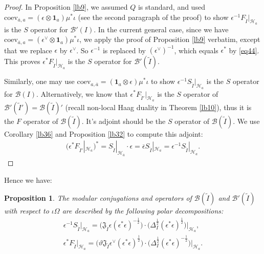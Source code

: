 \documentclass[12pt,a4paper]{article}
\theoremstyle{definition}
\theoremstyle{plain}
\newtheorem{pp}[df]{Proposition}
\newcommand{\fk}{\mathfrak}
\newcommand{\mc}{\mathcal}
\newcommand{\wtd}{\widetilde}
\newcommand{\ovl}{\overline}
\newcommand{\id}{\mathbf{1}}
\newcommand{\coev}{\mathrm{coev}}
\numberwithin{equation}{section}
\begin{document}
\begin{proof}
In Proposition \ref{lb9}, we assumed $Q$ is standard, and used $\coev_{\ovl a,a}=(\epsilon\otimes\id_a)\mu^*\iota$ (see the second paragraph of the proof) to show $\epsilon^{-1}F_{\wtd I}|_{\mc H_a}$ is the $S$ operator for $\mc B'(I)$. In the current general case, since we have $\coev_{\ovl a,a}=(\epsilon^\vee\otimes\id_a)\mu^*\iota$, we apply the proof of Proposition \ref{lb9} verbatim, except that we replace $\epsilon$ by $\epsilon^\vee$. So $\epsilon^{-1}$ is replaced by $(\epsilon^\vee)^{-1}$, which equals $\epsilon^*$ by \eqref{eq44}. This proves $\epsilon^* F_{\wtd I}|_{\mc H_a}$ is the $S$ operator for $\mc B'(\wtd I)$.

Similarly, one may use $\coev_{a,\ovl a}=(\id_a\otimes\epsilon)\mu^*\iota$ to show $\epsilon^{-1}S_{\wtd I}|_{\mc H_a}$ is the $S$ operator for $\mc B(I)$. Alternatively, we know that $\epsilon^*F_{\wtd I'}|_{\mc H_a}$ is the $S$ operator of $\mc B'(\wtd I')=\mc B(\wtd I)'$ (recall non-local Haag duality in Theorem \ref{lb10}), thus it is the $F$ operator of $\mc B(\wtd I)$. It's adjoint should be the $S$ operator of $\mc B(\wtd I)$. We use Corollary \ref{lb36} and Proposition \ref{lb32} to compute this adjoint:
\begin{align*}
(\epsilon^*F_{\wtd I'}|_{\mc H_a})^*=	S_{\wtd I}|_{\mc H_{\ovl a}}\cdot \epsilon=\ovl\epsilon S_{\wtd I}|_{\mc H_a}=\epsilon^{-1} S_{\wtd I}|_{\mc H_a}.
\end{align*}
\end{proof}

Hence we have:
\begin{pp}\label{lb15}
The modular conjugations and operators of $\mc B(\wtd I)$ and $\mc B'(\wtd I)$ with respect to $\iota\Omega$ are described by the following polar decompositions:
\begin{gather}
\epsilon^{-1} S_{\wtd I}\big|_{\mc H_a}=\big(\fk J_{\wtd I}\epsilon(\epsilon^*\epsilon)^{-\frac 12}\big)\cdot\big(\Delta_I^{\frac 12}(\epsilon^*\epsilon)^{\frac 12}\big)\Big|_{\mc H_a},\label{eq42}\\
\epsilon^* F_{\wtd I}\Big|_{\mc H_a}=\big(\vartheta\fk J_{\wtd I}\epsilon^\vee(\epsilon^*\epsilon)^{\frac 12}\big)\cdot\big(\Delta_I^{\frac 12}(\epsilon^*\epsilon)^{-\frac 12}\big)\Big|_{\mc H_a}.\label{eq43}
\end{gather}
\end{pp}
\end{document}
